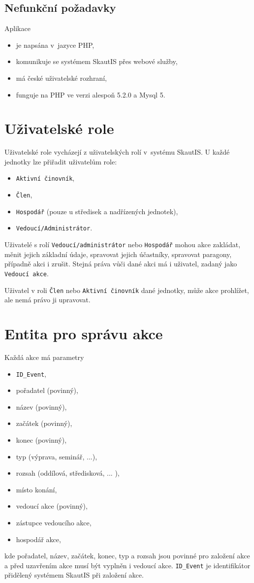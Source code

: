 \documentclass[thesis=B,czech]{FITthesis}[2011/06/14]
\begin{document}
\subsection{Nefunkční požadavky}
Aplikace 
\begin{itemize}
	\item je napsána v~jazyce PHP,
	\item komunikuje se systémem SkautIS přes webové služby,
	\item má české uživatelské rozhraní,
	\item funguje na PHP ve verzi alespoň 5.2.0 a Mysql 5.
\end{itemize}

\section{Uživatelské role}
Uživatelské role vycházejí z uživatelských rolí v~systému SkautIS. U každé jednotky lze přiřadit uživatelům role:

\begin{itemize}
	\item \texttt{Aktivní činovník},
	\item \texttt{Člen},
	\item \texttt{Hospodář} (pouze u středisek a nadřízených jednotek),
	\item \texttt{Vedoucí/Administrátor}.
\end{itemize}

Uživatelé s rolí \texttt{Vedoucí/administrátor} nebo \texttt{Hospodář} mohou akce zakládat, měnit jejich základní údaje, spravovat jejich účastníky, spravovat paragony, případně akci i zrušit. Stejná práva vůči dané akci má i uživatel, zadaný jako \texttt{Vedoucí akce}.

Uživatel v roli \texttt{Člen} nebo \texttt{Aktivní činovník} dané jednotky, může akce prohlížet, ale nemá právo ji upravovat.

\section{Entita pro správu akce}
\label{sec:eventDescription}
Každá akce má parametry
\begin{itemize}
	\item \texttt{ID\_Event},
	\item pořadatel (povinný),
	\item název (povinný),
	\item začátek (povinný),
	\item konec (povinný),
	\item typ (výprava, seminář, ...),
	\item rozsah (oddílová, středisková, ... ),
	\item místo konání,
	\item vedoucí akce (povinný),
	\item zástupce vedoucího akce,
	\item hospodář akce,
\end{itemize}
kde pořadatel, název, začátek, konec, typ a rozsah jsou povinné pro založení akce a před uzavřením akce musí být vyplněn i vedoucí akce. \texttt{ID\_Event} je identifikátor přidělený systémem SkautIS při založení akce.
\end{document}
